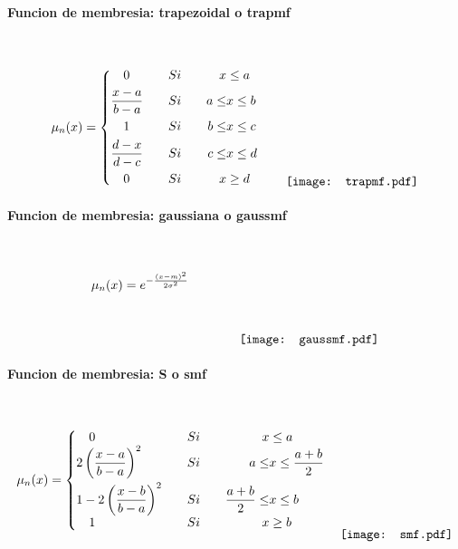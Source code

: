             \paragraph{Funcion de membresia: trapezoidal o trapmf}$\quad$
            
                \begin{equation}\label{eq:trapmf}
                    \mu_n(x) = \left\{
                        \begin{aligned}
                            &\quad 0  &\quad &Si \quad &  x &\leq a\\
                            &\frac{x - a}{b - a}  &\quad &Si \quad &  a \le &x \leq b \\
                            &\quad 1 &\quad &Si \quad &  b \le &x \leq c \\
                            &\frac{d - x}{d - c}  &\quad &Si \quad & c \le &x \leq d \\
                            &\quad 0  &\quad &Si \quad & x &\geq d
                        \end{aligned}\right.
                        \qquad
                        \raisebox{-15mm}{\texttt{[image: trapmf.pdf]}}
                \end{equation}

            \paragraph{Funcion de membresia: gaussiana o gaussmf}$\quad$
                
                \begin{equation}\label{eq:gaussmf}
                    \mu_n(x) = e^{-\frac{(x-m)^2}{2\sigma^2}}
                        \qquad \qquad
                        \raisebox{-15mm}{\texttt{[image: gaussmf.pdf]}}
                \end{equation}
                
            \paragraph{Funcion de membresia: S o smf}$\quad$
                
                \begin{equation}\label{eq:smf}
                    \mu_n(x) = \left\{
                        \begin{aligned}
                            &\quad 0  &\quad &Si \quad & x &\leq a\\[-4pt]
                            &2\left(\frac{x - a}{b - a}\right)^2  &\quad &Si \quad &  a \leq &x \leq \frac{a+b}{2} \\[-1pt]
                            &1 - 2\left(\frac{x - b}{b - a}\right)^2  &\quad &Si \quad & \frac{a+b}{2} \leq &x \leq b \\[-4pt]
                            &\quad 1  &\quad &Si \quad & x &\geq b
                        \end{aligned}\right.
                        \quad
                        \raisebox{-15mm}{\texttt{[image: smf.pdf]}}
                \end{equation}
            
